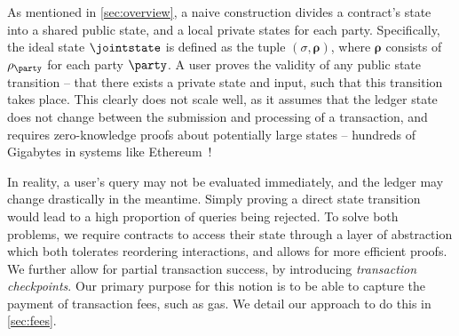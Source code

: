 As mentioned in \autoref{sec:overview}, a naive construction divides a
contract's state into a shared public state, and a local private states for each
party. Specifically, the ideal state $\jointstate$ is defined as the tuple
$(\sigma, \boldsymbol\rho)$, where $\boldsymbol\rho$ consists of $\rho_\party$
for each party $\party$. A user proves the validity of any public state
transition -- that there exists a private state and input, such that this
transition takes place. This clearly does not scale well, as it assumes that the
ledger state does not change between the submission and processing of a
transaction, and requires zero-knowledge proofs about potentially large states
-- hundreds of Gigabytes in systems like Ethereum~\cite{ethersize}!

In reality, a user's query may not be evaluated immediately, and the ledger may
change drastically in the meantime. Simply proving a direct state transition
would lead to a high proportion of queries being rejected. 
To solve both problems, we require contracts to access their state through a
layer of abstraction which both tolerates reordering interactions, and allows
for more efficient proofs. We further allow for partial transaction
  success, by introducing \emph{transaction checkpoints}. Our primary purpose
  for this notion is to be able to capture the payment of transaction fees, such
  as gas. We detail our approach to do this in
  \iffull\autoref{sec:fees}\else\cite[Appendix~J.5]{fullversion}\fi.

